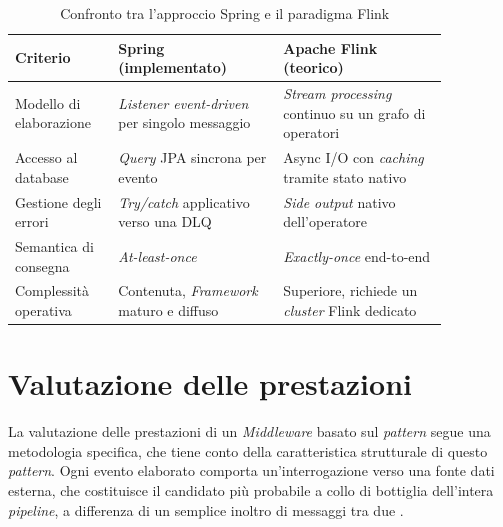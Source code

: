 \begin{table}[H]
    \setlength{\tabcolsep}{10pt}
    \def\arraystretch{1.5}
    \centering
        \begin{tabular}{|p{0.20\linewidth}|p{0.33\linewidth}|p{0.33\linewidth}|}
        \hline
        \textbf{Criterio} & \textbf{Spring (implementato)} & \textbf{Apache Flink (teorico)} \\ \hline
        Modello di elaborazione & \textit{Listener event-driven} per singolo messaggio & \textit{Stream processing} continuo su un grafo di operatori \\ \hline
        Accesso al database & \textit{Query} \acrshort{JPA} sincrona per evento & Async I/O con \textit{caching} tramite stato nativo \\ \hline
        Gestione degli errori & \textit{Try/catch} applicativo verso una \acrshort{DLQ} & \textit{Side output} nativo dell'operatore \\ \hline
        Semantica di consegna & \textit{At-least-once} & \textit{Exactly-once} end-to-end \\ \hline
        Complessità operativa & Contenuta, \textit{\gls{Framework}} maturo e diffuso & Superiore, richiede un \textit{cluster} Flink dedicato \\ \hline
        \end{tabular}
    \caption{Confronto tra l'approccio Spring e il paradigma Flink}
    \label{Tabella confronto Spring Flink}
\end{table}

\section{Valutazione delle prestazioni}
\label{Valutazione delle prestazioni}
La valutazione delle prestazioni di un \textit{Middleware} basato sul \textit{pattern}  segue una metodologia specifica, che tiene conto della caratteristica strutturale di questo \textit{pattern}.
Ogni evento elaborato comporta un'interrogazione verso una fonte dati esterna, che costituisce il candidato più probabile a collo di bottiglia dell'intera \textit{pipeline}, a differenza di un semplice inoltro di messaggi tra due \textit{}.

